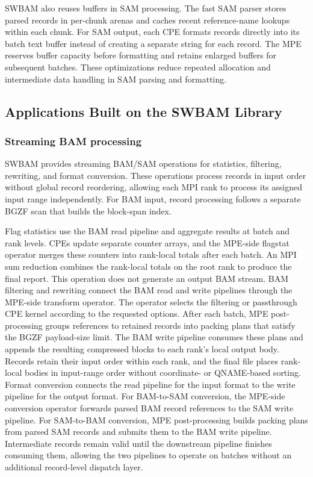 \documentclass[lettersize,journal]{IEEEtran}
\begin{document}
SWBAM also reuses buffers in SAM processing.
The fast SAM parser stores parsed records in per-chunk arenas and caches recent reference-name lookups within each chunk.
For SAM output, each CPE formats records directly into its batch text buffer instead of creating a separate string for each record.
The MPE reserves buffer capacity before formatting and retains enlarged buffers for subsequent batches.
These optimizations reduce repeated allocation and intermediate data handling in SAM parsing and formatting.

\subsection{Applications Built on the SWBAM Library}
\subsubsection{Streaming BAM processing}
SWBAM provides streaming BAM/SAM operations for statistics, filtering, rewriting, and format conversion.
These operations process records in input order without global record reordering, allowing each MPI rank to process its assigned input range independently.
For BAM input, record processing follows a separate BGZF scan that builds the block-span index.

Flag statistics use the BAM read pipeline and aggregate results at batch and rank levels.
CPEs update separate counter arrays, and the MPE-side flagstat operator merges these counters into rank-local totals after each batch.
An MPI sum reduction combines the rank-local totals on the root rank to produce the final report.
This operation does not generate an output BAM stream.
BAM filtering and rewriting connect the BAM read and write pipelines through the MPE-side transform operator.
The operator selects the filtering or passthrough CPE kernel according to the requested options.
After each batch, MPE post-processing groups references to retained records into packing plans that satisfy the BGZF payload-size limit.
The BAM write pipeline consumes these plans and appends the resulting compressed blocks to each rank's local output body.
Records retain their input order within each rank, and the final file places rank-local bodies in input-range order without coordinate- or QNAME-based sorting.
Format conversion connects the read pipeline for the input format to the write pipeline for the output format.
For BAM-to-SAM conversion, the MPE-side conversion operator forwards parsed BAM record references to the SAM write pipeline.
For SAM-to-BAM conversion, MPE post-processing builds packing plans from parsed SAM records and submits them to the BAM write pipeline.
Intermediate records remain valid until the downstream pipeline finishes consuming them, allowing the two pipelines to operate on batches without an additional record-level dispatch layer.
\end{document}
